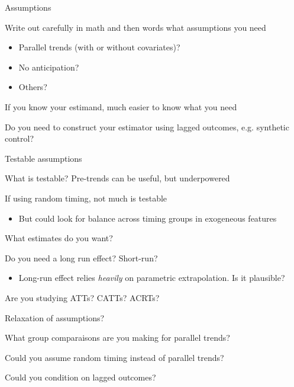 \documentclass[notes,11pt, aspectratio=169]{beamer}
\newenvironment{wideitemize}{\itemize\addtolength{\itemsep}{10pt}}{\enditemize}
\begin{document}
\begin{frame}{Assumptions}
  \begin{wideitemize}
  \item Write out carefully in math and then words what assumptions you need
    \begin{itemize}
    \item Parallel trends (with or without covariates)?
    \item No anticipation?
    \item Others?
    \end{itemize}
  \item If you know your estimand, much easier to know what you need
  \item Do you need to construct your estimator using lagged outcomes, e.g. synthetic control?
  \end{wideitemize}
\end{frame}

\begin{frame}{Testable assumptions}
  \begin{wideitemize}
  \item What is testable? Pre-trends can be useful, but underpowered
  \item If using random timing, not much is testable
    \begin{itemize}
    \item But could look for balance across timing groups in exogeneous features
    \end{itemize}
  \end{wideitemize}
\end{frame}

\begin{frame}{What estimates do you want?}
  \begin{wideitemize}
  \item Do you need a long run effect? Short-run?
    \begin{itemize}
    \item Long-run effect relies \emph{heavily} on parametric
      extrapolation. Is it plausible?
    \end{itemize}
  \item Are you studying ATTs? CATTs? ACRTs?
  \end{wideitemize}
\end{frame}

\begin{frame}{Relaxation of assumptions?}
  \begin{wideitemize}
  \item What group comparaisons are you making for parallel trends?
  \item Could you assume random timing instead of parallel trends?
  \item Could you condition on lagged outcomes?
  \end{wideitemize}
\end{frame}
\end{document}
